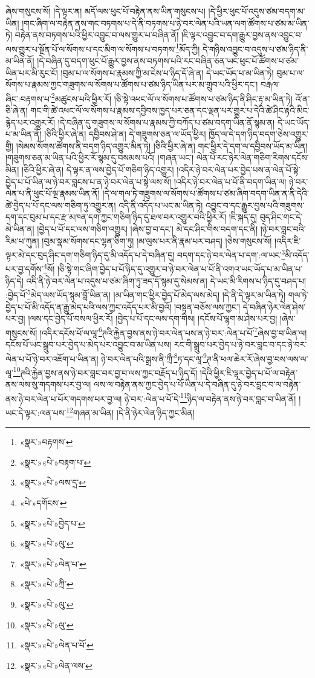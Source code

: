 ཞེས་གསུངས་སོ། །དེ་ལྟར་ན། མདོ་ལས་ཕུང་པོ་བརྟེན་ནས་ཡིན་གསུངས་པ། །དེ་ཕྱིར་ཕུང་པོ་འདུས་ཙམ་བདག་མ་ཡིན། །གང་ཞིག་ལ་བརྟེན་ནས་གང་བཏགས་པ་དེ་ནི་བཏགས་པ་ཉེ་བར་ལེན་པའི་ཡན་ལག་ཚོགས་པ་ཙམ་མ་ཡིན་ཏེ། བརྟེན་ནས་བཏགས་པའི་ཕྱིར་འབྱུང་བ་ལས་གྱུར་པ་བཞིན་ནོ། །ཇི་ལྟར་འབྱུང་བ་དག་རྒྱུར་བྱས་ནས་འབྱུང་བ་ལས་གྱུར་པ་སྔོན་པོ་ལ་སོགས་པ་དང་མིག་ལ་སོགས་པ་བཏགས་\footnote{«སྣར་»བརྟགས་}མོད་ཀྱི། དེ་གཉིས་འབྱུང་བ་འདུས་པ་ཙམ་ཉིད་ནི་མ་ཡིན་ནོ། །དེ་བཞིན་དུ་བདག་ཕུང་པོ་རྒྱུར་བྱས་ནས་བཏགས་པའི་རང་བཞིན་ཅན་ཡང་ཕུང་པོ་ཚོགས་པ་ཙམ་ཡིན་པར་མི་རུང་ངོ། །བུམ་པ་ལ་སོགས་པ་རྣམས་ཀྱི་མ་ངེས་པ་ཉིད་དོ་ཞེ་ན། དེ་ཡང་ཡོད་པ་མ་ཡིན་ཏེ། བུམ་པ་ལ་སོགས་པ་རྣམས་ཀྱང་གཟུགས་ལ་སོགས་པ་ཚོགས་པ་ཙམ་ཉིད་ཡིན་པར་མ་གྲུབ་པའི་ཕྱིར་དང་། བརྒལ་ཞིང་:བརྟགས་པ་\footnote{«སྣར་»«པེ་»བརྟག་པ་}མཚུངས་པའི་ཕྱིར་རོ། །ཅི་སྟེ་འཕང་ལོ་ལ་སོགས་པ་ཚོགས་པ་ཙམ་ཉིད་ནི་ཤིང་རྟ་མ་ཡིན་ཏེ། འོ་ན་ཅི་ཞེ་ན། གང་གི་ཚེ་འཕང་ལོ་ལ་སོགས་པ་རྣམས་དབྱིབས་ཁྱད་པར་ཅན་དང་ལྡན་པར་གྱུར་པ་དེའི་ཚེ་ཤིང་རྟའི་མིང་རྙེད་པར་འགྱུར་རོ། །དེ་བཞིན་དུ་གཟུགས་ལ་སོགས་པ་རྣམས་ཀྱི་བཀོད་པ་ཙམ་བདག་ཡིན་ནོ་སྙམ་ན། དེ་ཡང་ཡོད་པ་མ་ཡིན་ནོ། །ཅིའི་ཕྱིར་ཞེ་ན། དབྱིབས་ཤེ་ན། དེ་གཟུགས་ཅན་ལ་ཡོད་ཕྱིར། ཁྱོད་ལ་དེ་དག་ཉིད་བདག་ཅེས་འགྱུར་གྱི། །སེམས་སོགས་ཚོགས་ནི་བདག་ཉིད་འགྱུར་མིན་ཏེ། །ཅིའི་ཕྱིར་ཞེ་ན། གང་ཕྱིར་དེ་དག་ལ་དབྱིབས་ཡོད་མ་ཡིན། །གཟུགས་ཅན་མ་ཡིན་པའི་ཕྱིར་རོ་སྙམ་དུ་བསམས་པའོ། །གཞན་ཡང་། ལེན་པོ་རང་ཉེར་ལེན་གཅིག་རིགས་དངོས་མིན། །ཅིའི་ཕྱིར་ཞེ་ན། དེ་ལྟར་ན་ལས་བྱེད་པོ་གཅིག་ཉིད་འགྱུར། །འདིར་ཉེ་བར་ལེན་པར་བྱེད་པས་ན་ལེན་པོ་སྟེ་བྱེད་པ་པོ་ཡིན་ལ་ཉེ་བར་བླངས་པ་ན་ཉེ་བར་ལེན་པ་སྟེ་ལས་སོ། །འདིར་ཉེ་བར་ལེན་པ་པོ་ནི་བདག་ཡིན་ལ། ཉེ་བར་ལེན་པ་ནི་ཕུང་པོ་ལྔ་རྣམས་ཡིན་ནོ། །དེ་ལ་གལ་ཏེ་གཟུགས་ལ་སོགས་པ་ཚོགས་པ་ཙམ་ཞིག་བདག་ཡིན་ན་ནི་དེའི་ཚེ་བྱེད་པ་པོ་དང་ལས་གཅིག་ཏུ་འགྱུར་ན། འདི་ནི་འདོད་པ་ཡང་མ་ཡིན་ཏེ། འབྱུང་བ་དང་རྒྱུར་བྱས་པའི་གཟུགས་དག་དང་བུམ་པ་དང་རྫ་མཁན་དག་ཀྱང་གཅིག་ཉིད་དུ་ཐལ་བར་འགྱུར་བའི་ཕྱིར་རོ། །ཇི་སྐད་དུ། བུད་ཤིང་གང་དེ་མེ་ཡིན་ན། །བྱེད་པ་པོ་དང་ལས་གཅིག་འགྱུར། །ཞེས་བྱ་བ་དང་། མེ་དང་ཤིང་གིས་བདག་དང་ནི། །ཉེ་བར་བླང་བའི་རིམ་པ་ཀུན། །བུམ་སྣམ་སོགས་དང་ལྷན་ཅིག་ཏུ། །མ་ལུས་པར་ནི་རྣམ་པར་བཤད། །ཅེས་གསུངས་སོ། །འདིར་ཇི་ལྟར་མེ་དང་བུད་ཤིང་དག་གཅིག་ཉིད་དུ་མི་འདོད་པ་དེ་བཞིན་དུ། བདག་དང་ཉེ་བར་ལེན་པ་དག་:ལ་ཡང་\footnote{«སྣར་»«པེ་»ལས་དྲ་}མི་འདོད་པར་བྱ་དགོས་\footnote{«པེ་»དགོངས་}སོ། །ཅི་སྟེ་གང་ཞིག་བྱེད་པ་པོ་ཉིད་དུ་འགྱུར་བ་ཉེ་བར་ལེན་པ་པོ་ནི་འགའ་ཡང་ཡོད་པ་མ་ཡིན་པ་ཉིད་དེ། འདི་ནི་ཉེ་བར་ལེན་པ་འདུས་པ་ཙམ་ཞིག་ཏུ་ཟད་དོ་སྙམ་དུ་སེམས་ན། དེ་ཡང་མི་རིགས་པ་ཉིད་དུ་བཤད་པ། :བྱེད་པོ་\footnote{«སྣར་»«པེ་»བྱེད་པ་}མེད་ལས་ཡོད་སྙམ་བློ་ཡིན་ན། །མ་ཡིན་གང་ཕྱིར་བྱེད་པོ་མེད་ལས་མེད། །དེ་ནི་དེ་ལྟར་མ་ཡིན་ཏེ། གལ་ཏེ་བྱེད་པ་པོ་མི་འདོད་ན་རྒྱུ་མེད་པའི་ལས་ཀྱང་འདོད་པར་མི་བྱའོ། །བསྟན་བཅོས་ལས་ཀྱང་། དེ་བཞིན་ཉེར་ལེན་ཤེས་པར་བྱ། །ལས་དང་བྱེད་པོ་བསལ་ཕྱིར་རོ། །བྱེད་པ་པོ་དང་ལས་དག་གིས། །དངོས་པོ་ལྷག་མ་ཤེས་པར་བྱ། །ཞེས་གསུངས་སོ། །འདིར་དངོས་པོ་ལ་ལཱ་\footnote{«སྣར་»«པེ་»ལུ་}ཊའི་རྐྱེན་བྱས་ནས་ཉེ་བར་ལེན་པས་ན་ཉེ་བར་:ལེན་པ་པོ་\footnote{«སྣར་»«པེ་»ལེན་པ་}ཞེས་བྱ་བ་ཡིན་ལ། དངོས་པོ་ཡང་སྒྲུབ་པར་བྱེད་པ་མེད་པར་འབྱུང་བ་མ་ཡིན་པས། རང་གི་སྒྲུབ་པར་བྱེད་པ་ཉེ་བར་བླང་བ་དང་ཉེ་བར་ལེན་པ་པོ་ཉེ་བར་འཇོག་པ་ཡིན་ན། ཉེ་བར་ལེན་པའི་སྒྲས་ནི་ཀྲྀ་\footnote{«སྣར་»«པེ་»ཀྲི་}ཏ་དང་ལཱ་\footnote{«སྣར་»«པེ་»ལུ་}ཊ་ནི་ཕལ་ཆེར་རོ་ཞེས་བྱ་བས་ལས་ལ་ལཱ་\footnote{«སྣར་»«པེ་»ལུ་}ཊའི་རྐྱེན་བྱས་ནས་ཉེ་བར་བླང་བར་བྱ་བ་ལས་ཀྱང་བརྗོད་པ་ཉིད་དོ། །དེའི་ཕྱིར་ཇི་ལྟར་བྱེད་པ་པོ་ལ་བརྟེན་ནས་ལས་སུ་གདགས་པར་བྱ་ལ། ལས་ལ་བརྟེན་ནས་ཀྱང་བྱེད་པ་པོ་ཡིན་པ་དེ་བཞིན་དུ་ཉེ་བར་བླང་བ་ལ་བརྟེན་ནས་ཉེ་བར་ལེན་པ་པོར་གདགས་པར་བྱ་ལ། ཉེ་བར་:ལེན་པ་པོ་དེ་\footnote{«སྣར་»«པེ་»ལེན་པ་པོ་}ཉིད་ལ་བརྟེན་ནས་ཉེ་བར་བླང་བ་ཡིན་ནོ། །ཡང་དེ་ལྟར་:ལན་པས་\footnote{«སྣར་»«པེ་»ལེན་ལས་}གཞན་མ་ཡིན། །དེ་ནི་ཉེར་ལེན་ཉིད་ཀྱང་མིན། 